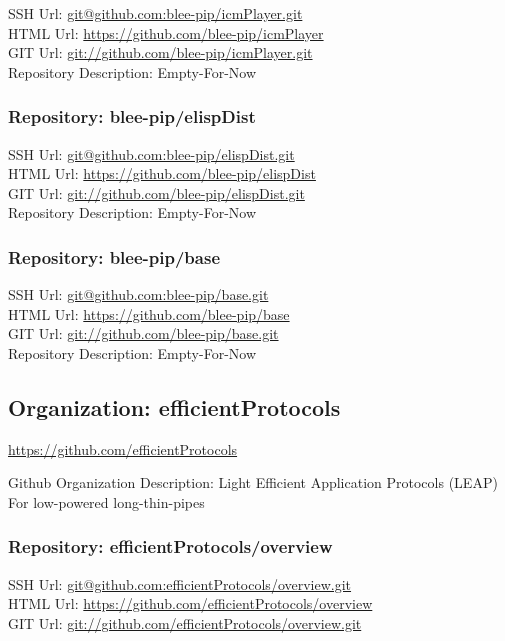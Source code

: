 SSH Url:  \url{git@github.com:blee-pip/icmPlayer.git}\\
HTML Url: \url{https://github.com/blee-pip/icmPlayer}\\
GIT Url:  \url{git://github.com/blee-pip/icmPlayer.git}\\


Repository Description: Empty-For-Now

\subsubsection{Repository: blee-pip/elispDist}

SSH Url:  \url{git@github.com:blee-pip/elispDist.git}\\
HTML Url: \url{https://github.com/blee-pip/elispDist}\\
GIT Url:  \url{git://github.com/blee-pip/elispDist.git}\\


Repository Description: Empty-For-Now

\subsubsection{Repository: blee-pip/base}

SSH Url:  \url{git@github.com:blee-pip/base.git}\\
HTML Url: \url{https://github.com/blee-pip/base}\\
GIT Url:  \url{git://github.com/blee-pip/base.git}\\


Repository Description: Empty-For-Now

\subsection{Organization: efficientProtocols}

\url{https://github.com/efficientProtocols}

Github Organization Description: Light Efficient Application Protocols (LEAP) For low-powered long-thin-pipes

\subsubsection{Repository: efficientProtocols/overview}

SSH Url:  \url{git@github.com:efficientProtocols/overview.git}\\
HTML Url: \url{https://github.com/efficientProtocols/overview}\\
GIT Url:  \url{git://github.com/efficientProtocols/overview.git}\\


